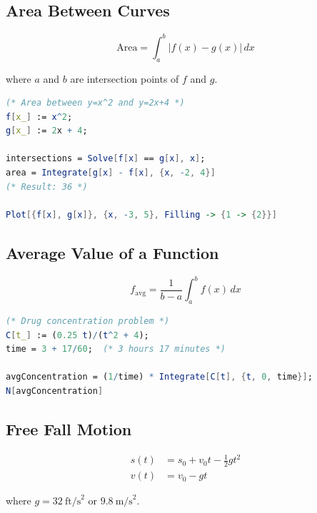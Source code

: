 \documentclass[12pt,a4paper]{article}
\begin{document}
\subsection{Area Between Curves}

\begin{formulabox}
    \[ \text{Area} = \int_a^b |f(x) - g(x)|\,dx \]
    
    where \(a\) and \(b\) are intersection points of \(f\) and \(g\).
\end{formulabox}

\begin{mathematicabox}
    \begin{lstlisting}[language=Mathematica, basicstyle=\ttfamily\small]
(* Area between y=x^2 and y=2x+4 *)
f[x_] := x^2;
g[x_] := 2x + 4;

intersections = Solve[f[x] == g[x], x];
area = Integrate[g[x] - f[x], {x, -2, 4}]
(* Result: 36 *)

Plot[{f[x], g[x]}, {x, -3, 5}, Filling -> {1 -> {2}}]
    \end{lstlisting}
\end{mathematicabox}

\subsection{Average Value of a Function}

\begin{formulabox}
    \[ f_{\text{avg}} = \frac{1}{b-a} \int_a^b f(x)\,dx \]
\end{formulabox}

\begin{mathematicabox}
    \begin{lstlisting}[language=Mathematica, basicstyle=\ttfamily\small]
(* Drug concentration problem *)
C[t_] := (0.25 t)/(t^2 + 4);
time = 3 + 17/60;  (* 3 hours 17 minutes *)

avgConcentration = (1/time) * Integrate[C[t], {t, 0, time}];
N[avgConcentration]
    \end{lstlisting}
\end{mathematicabox}

\subsection{Free Fall Motion}

\begin{formulabox}
    \begin{align*}
    s(t) &= s_0 + v_0 t - \frac{1}{2}gt^2 \\
    v(t) &= v_0 - gt
    \end{align*}
    
    where \(g = 32\ \text{ft/s}^2\) or \(9.8\ \text{m/s}^2\).
\end{formulabox}
\end{document}
